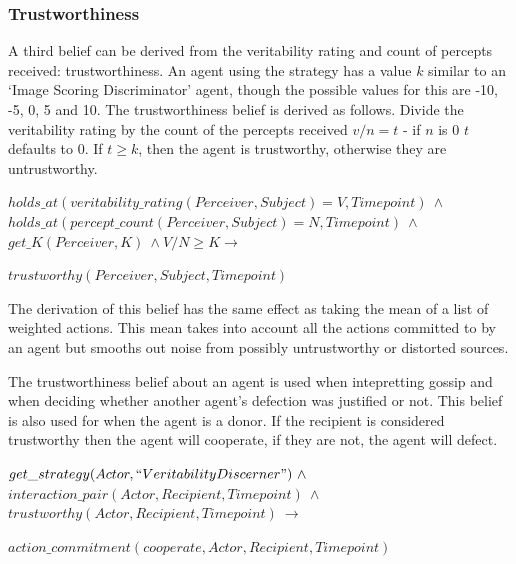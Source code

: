 \documentclass[]{final_report}
\begin{document}
\subsubsection{Trustworthiness}
A third belief can be derived from the veritability rating and count of percepts received: trustworthiness. An agent using the strategy has a value $k$ similar to an `Image Scoring Discriminator' agent, though the possible values for this are -10, -5, 0, 5 and 10. The trustworthiness belief is derived as follows. Divide the veritability rating by the count of the percepts received $v/n=t$ - if $n$ is 0 $t$ defaults to 0. If $t\ge k$, then the agent is trustworthy, otherwise they are untrustworthy.
\begin{framed}
		\begin{flushleft}
			\vspace{-20pt}
			$holds\_at(veritability\_rating(Perceiver, Subject)=V, Timepoint)\ \wedge$\\
			$holds\_at(percept\_count(Perceiver, Subject)=N, Timepoint)\ \wedge$\\
			$get\_K(Perceiver, K)\ \wedge V/N \ge K \rightarrow $
		\end{flushleft}
		\vspace{-30pt}
		\begin{flushright}
			$trustworthy(Perceiver, Subject, Timepoint)$
		\end{flushright}
		\vspace{-10pt}
\end{framed}
The derivation of this belief has the same effect as taking the mean of a list of weighted actions. This mean takes into account all the actions committed to by an agent but smooths out noise from possibly untrustworthy or distorted sources.\par
The trustworthiness belief about an agent is used when intepretting gossip and when deciding whether another agent's defection was justified or not. This belief is also used for when the agent is a donor. If the recipient is considered trustworthy then the agent will cooperate, if they are not, the agent will defect.
\begin{framed}
		\begin{flushleft}
		\vspace{-20pt}
			$get\_strategy(Actor, ``Veritability Discerner")\ \wedge$\\
			$interaction\_pair(Actor, Recipient, Timepoint)\ \wedge$\\
			$trustworthy(Actor, Recipient, Timepoint)\ \rightarrow$\\
		\end{flushleft}
		\vspace{-30pt}
		\begin{flushright}
			$action\_commitment(cooperate, Actor, Recipient, Timepoint)$
		\end{flushright}
		\vspace{-10pt}
\end{framed}
\end{document}
